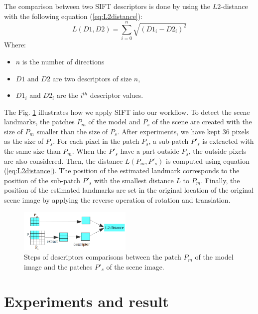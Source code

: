 \documentclass[twoside,twocolumn,10pt]{article}
\begin{document}
The comparison between two SIFT descriptors is done by using the $L2$-distance with the following equation (\ref{eq:L2distance}):
\begin{equation}
\label{eq:L2distance}
	L(D1,D2) = \sum\limits_{i = 0}^{n}\sqrt{(D1_i-D2_i)^2}
\end{equation}
Where:
\begin{itemize}[nosep,label=\footnotesize$\bullet$]
	\item $n$ is the number of directions
	\item $D1$ and $D2$ are two descriptors of size $n$,
	\item $D1_i$ and $D2_i $ are the $i^{th}$ descriptor values.
\end{itemize}
The Fig. \ref{fig:Illustrate} illustrates how we apply SIFT into our workflow.
To detect the scene landmarks, the patches \textit{$P_m$} of the model and \textit{$P_s$} of the scene are created with the size of $P_m$ smaller than the size of $P_s$.
After experiments, we have kept 36 pixels as the size of \textit{$P_s$}.
For each pixel in the patch \textit{$P_s$}, a sub-patch \textit{$P'_s$} is extracted with the same size than \textit{$P_m$}.
When the \textit{$P'_s$} have a part outside \textit{$P_s$}, the outside pixels are also considered.
Then, the distance \textit{$L(P_m,P'_s)$} is computed using equation (\ref{eq:L2distance}).
The position of the estimated landmark corresponds to the position of the sub-patch \textit{$P'_s$} with the smallest distance $L$ to \textit{$P_m$}.
Finally, the position of the estimated landmarks are set in the original location of the original scene image by applying the reverse operation of rotation and translation.
\begin{figure}[htb]
    \centering
    \includegraphics[width=0.48\textwidth]{./images/illustration_SIFT}
    \caption{Steps of descriptors comparisons between the patch $P_m$ of the model image and the patches $P'_s$ of the scene image.}
    \label{fig:Illustrate}
\end{figure}


\section{Experiments and result}
\end{document}
